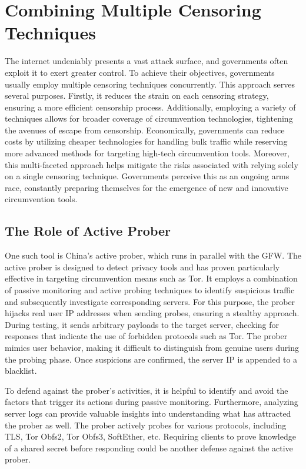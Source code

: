 \section{Combining Multiple Censoring Techniques}
The internet undeniably presents a vast attack surface, and governments often exploit it to exert greater control. To achieve their objectives, governments usually employ multiple censoring techniques concurrently. This approach serves several purposes. Firstly, it reduces the strain on each censoring strategy, ensuring a more efficient censorship process. Additionally, employing a variety of techniques allows for broader coverage of circumvention technologies, tightening the avenues of escape from censorship. Economically, governments can reduce costs by utilizing cheaper technologies for handling bulk traffic while reserving more advanced methods for targeting high-tech circumvention tools. Moreover, this multi-faceted approach helps mitigate the risks associated with relying solely on a single censoring technique. Governments perceive this as an ongoing arms race, constantly preparing themselves for the emergence of new and innovative circumvention tools.

\subsection{The Role of Active Prober}
One such tool is China's active prober, which runs in parallel with the GFW. The active prober is designed to detect privacy tools and has proven particularly effective in targeting circumvention means such as Tor. It employs a combination of passive monitoring and active probing techniques to identify suspicious traffic and subsequently investigate corresponding servers. For this purpose, the prober hijacks real user IP addresses when sending probes, ensuring a stealthy approach. During testing, it sends arbitrary payloads to the target server, checking for responses that indicate the use of forbidden protocols such as Tor. The prober mimics user behavior, making it difficult to distinguish from genuine users during the probing phase. Once suspicions are confirmed, the server IP is appended to a blacklist.\cite{ensafi2015firewall}

To defend against the prober's activities, it is helpful to identify and avoid the factors that trigger its actions during passive monitoring. Furthermore, analyzing server logs can provide valuable insights into understanding what has attracted the prober as well. The prober actively probes for various protocols, including TLS, Tor Obfs2, Tor Obfs3, SoftEther, etc. Requiring clients to prove knowledge of a shared secret before responding could be another defense against the active prober.\cite{ensafi2015firewall}

